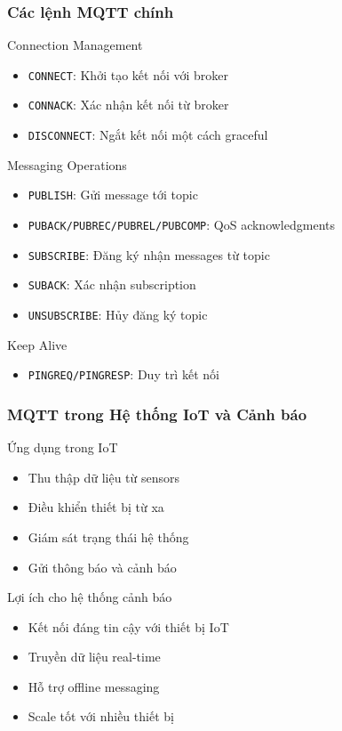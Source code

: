 \begin{frame}
\frametitle{Các lệnh MQTT chính}

\begin{block}{Connection Management}
\begin{itemize}
\item \texttt{CONNECT}: Khởi tạo kết nối với broker
\item \texttt{CONNACK}: Xác nhận kết nối từ broker
\item \texttt{DISCONNECT}: Ngắt kết nối một cách graceful
\end{itemize}
\end{block}

\begin{block}{Messaging Operations}
\begin{itemize}
\item \texttt{PUBLISH}: Gửi message tới topic
\item \texttt{PUBACK/PUBREC/PUBREL/PUBCOMP}: QoS acknowledgments
\item \texttt{SUBSCRIBE}: Đăng ký nhận messages từ topic
\item \texttt{SUBACK}: Xác nhận subscription
\item \texttt{UNSUBSCRIBE}: Hủy đăng ký topic
\end{itemize}
\end{block}

\begin{block}{Keep Alive}
\begin{itemize}
\item \texttt{PINGREQ/PINGRESP}: Duy trì kết nối
\end{itemize}
\end{block}

\end{frame}

\begin{frame}
\frametitle{MQTT trong Hệ thống IoT và Cảnh báo}

\begin{block}{Ứng dụng trong IoT}
\begin{itemize}
\item Thu thập dữ liệu từ sensors
\item Điều khiển thiết bị từ xa
\item Giám sát trạng thái hệ thống
\item Gửi thông báo và cảnh báo
\end{itemize}
\end{block}

\begin{block}{Lợi ích cho hệ thống cảnh báo}
\begin{itemize}
\item Kết nối đáng tin cậy với thiết bị IoT
\item Truyền dữ liệu real-time
\item Hỗ trợ offline messaging
\item Scale tốt với nhiều thiết bị
\end{itemize}
\end{block}

\end{frame}

